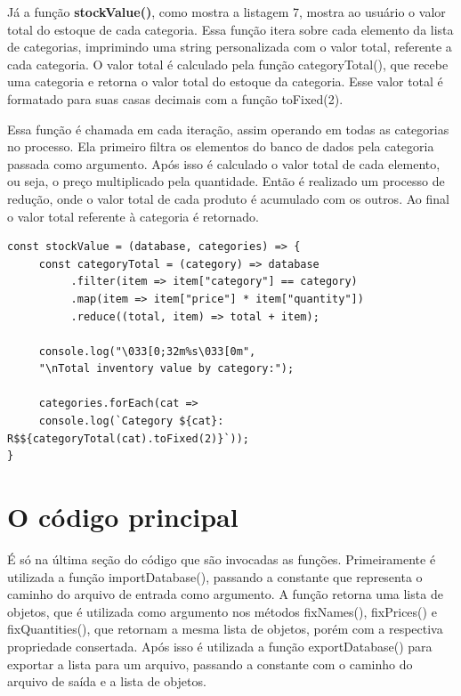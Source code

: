 \documentclass[12pt]{article}
\begin{document}
Já a função \textbf{stockValue()}, como mostra a listagem 7, mostra ao usuário o valor total do estoque de cada categoria. Essa função itera sobre cada elemento da lista de categorias, imprimindo uma string personalizada com o valor total, referente a cada categoria. O valor total é calculado pela função categoryTotal(), que recebe uma categoria e retorna o valor total do estoque da categoria. Esse valor total é formatado para suas casas decimais com a função toFixed(2). 

Essa função é chamada em cada iteração, assim operando em todas as categorias no processo. Ela primeiro filtra os elementos do banco de dados pela categoria passada como argumento. Após isso é calculado o valor total de cada elemento, ou seja, o preço multiplicado pela quantidade. Então é realizado um processo de redução, onde o valor total de cada produto é acumulado com os outros. Ao final o valor total referente à categoria é retornado.
\begin{lstlisting}[caption=Função stockValue()]
const stockValue = (database, categories) => {
     const categoryTotal = (category) => database
          .filter(item => item["category"] == category)
          .map(item => item["price"] * item["quantity"])
          .reduce((total, item) => total + item);
     
     console.log("\033[0;32m%s\033[0m",
     "\nTotal inventory value by category:");
     
     categories.forEach(cat => 
     console.log(`Category ${cat}: R$${categoryTotal(cat).toFixed(2)}`));
}
\end{lstlisting}

\section{O código principal}

É só na última seção do código que são invocadas as funções. Primeiramente é utilizada a função importDatabase(), passando a constante que representa o caminho do arquivo de entrada como argumento. A função retorna uma lista de objetos, que é utilizada como argumento nos métodos fixNames(), fixPrices() e fixQuantities(), que retornam a mesma lista de objetos, porém com a respectiva propriedade consertada. Após isso é utilizada a função exportDatabase() para exportar a lista para um arquivo, passando a constante com o caminho do arquivo de saída e a lista de objetos.
\end{document}
